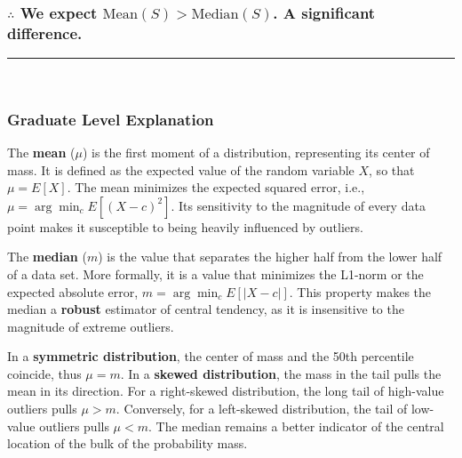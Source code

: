 \documentclass{article}
\begin{document}
\subsubsection*{\normalfont $\therefore$ We expect $\text{Mean}(S) > \text{Median}(S)$. A significant difference.}


\noindent\rule{\textwidth}{0.4pt}\\

\newpage

\subsubsection*{\normalfont Graduate Level Explanation}
\parbox{\textwidth}{
The \textbf{mean} ($\mu$) is the first moment of a distribution, representing its center of mass. It is defined as the expected value of the random variable $X$, so that $\mu = E[X]$. The mean minimizes the expected squared error, i.e., $\mu = \arg\min_c E[(X-c)^2]$. Its sensitivity to the magnitude of every data point makes it susceptible to being heavily influenced by outliers.

\vspace{0.5em}

The \textbf{median} ($m$) is the value that separates the higher half from the lower half of a data set. More formally, it is a value that minimizes the L1-norm or the expected absolute error, $m = \arg\min_c E[|X-c|]$. This property makes the median a \textbf{robust} estimator of central tendency, as it is insensitive to the magnitude of extreme outliers.

\vspace{0.5em}

In a \textbf{symmetric distribution}, the center of mass and the 50th percentile coincide, thus $\mu = m$. In a \textbf{skewed distribution}, the mass in the tail pulls the mean in its direction. For a right-skewed distribution, the long tail of high-value outliers pulls $\mu > m$. Conversely, for a left-skewed distribution, the tail of low-value outliers pulls $\mu < m$. The median remains a better indicator of the central location of the bulk of the probability mass.
}

\vspace{2em}
\end{document}
